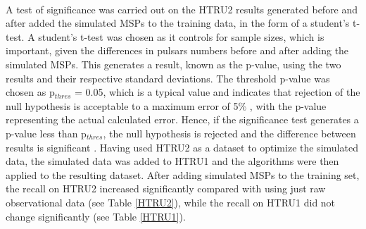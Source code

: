 \documentclass[12pt]{article}
\begin{document}
\paragraph{}
\begin{table}[h!]
\centering
{}
\caption{Recall on HTRU2 MSPs (class 1) using the HTRU2 noise (class 0) and non-MSPs (class 1) as training data}
\label{HTRU2}
\end{table}

A test of significance was carried out on the HTRU2 results generated before and after added the simulated MSPs to the training data, in the form of a student's t-test. A student's t-test was chosen as it controls for sample sizes, which is important, given the differences in pulsars numbers before and after adding the simulated MSPs. This generates a result, known as the p-value, using the two results and their respective standard deviations. The threshold p-value was chosen as p$_{thres}$ = 0.05, which is a typical value and indicates that rejection of the null hypothesis is acceptable to a maximum error of 5$\%$ , with the p-value representing the actual calculated error. Hence, if the significance test generates a p-value less than p$_{thres}$, the null hypothesis is rejected and the difference between results is significant \cite{friedman2001elements}. Having used HTRU2 as a dataset to optimize the simulated data, the simulated data was added to HTRU1 and the algorithms were then applied to the resulting dataset. After adding simulated MSPs to the training set, the recall on HTRU2 increased significantly compared with using just raw observational data (see Table \ref{HTRU2}), while the recall on HTRU1 did not change significantly (see Table \ref{HTRU1}).
\end{document}
